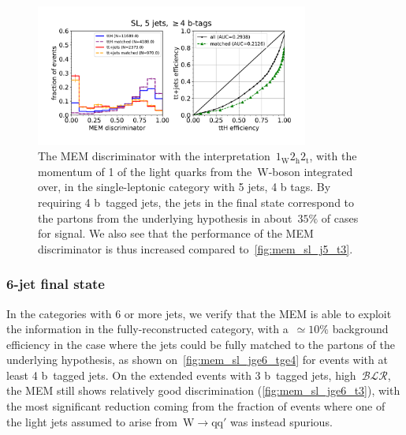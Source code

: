 \begin{figure}[ht]
\begin{centering}
\includegraphics[width = 0.8\textwidth]{figures/mem/mem_sl_j5_tge4.pdf}
\caption[MEM with the~$1_{\mathrm{W}} 2_{\mathrm{h}} 2_{\mathrm{t}}$ interpretation in the 5 jet, $\ge4$ b~tags category]{The MEM discriminator with the interpretation~$1_{\mathrm{W}} 2_{\mathrm{h}} 2_{\mathrm{t}}$, with the momentum of 1 of the light quarks from the~$\mathrm{W}$-boson integrated over, in the single-leptonic category with 5 jets, 4 b tags. By requiring 4 b~tagged jets, the jets in the final state correspond to the partons from the underlying hypothesis in about~$35\%$ of cases for signal. We also see that the performance of the MEM discriminator is thus increased compared to~\cref{fig:mem_sl_j5_t3}.}
\label{fig:mem_sl_j5_t4}
\end{centering}
\end{figure}

\subsubsection{6-jet final state}
In the categories with 6 or more jets, we verify that the MEM is able to exploit the information in the fully-reconstructed category, with a~$\simeq 10\%$ background efficiency in the case where the jets could be fully matched to the partons of the underlying hypothesis, as shown on~\cref{fig:mem_sl_jge6_tge4} for events with at least 4 b~tagged jets. On the extended events with 3 b~tagged jets, high~$\mathcal{BLR}$, the MEM still shows relatively good discrimination (\cref{fig:mem_sl_jge6_t3}), with the most significant reduction coming from the fraction of events where one of the light jets assumed to arise from~$\mathrm{W} \rightarrow \mathrm{q} \mathrm{q}'$ was instead spurious.

